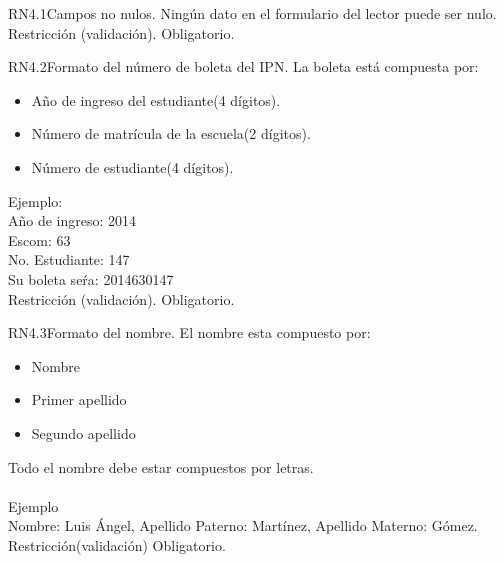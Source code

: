 
\begin{BussinesRule}{RN4.1}{Campos no nulos.} 
	\BRitem[Descripción:] Ningún dato en el formulario del lector puede ser nulo.
	\BRitem[Tipo:] Restricción (validación).
	\BRitem[Nivel:] Obligatorio.
\end{BussinesRule}


\begin{BussinesRule}{RN4.2}{Formato del número de boleta del IPN.}
	\BRitem[Descripción:] La boleta está compuesta por:
		\begin{itemize} 
			\item Año de ingreso del estudiante(4 dígitos).
			\item Número de matrícula de la escuela(2 dígitos).
			\item Número de estudiante(4 dígitos).
		\end{itemize}
	Ejemplo:\\
		Año de ingreso: 2014\\
		Escom: 63\\
		No. Estudiante: 147\\
		Su boleta seŕa: 2014630147\\
	\BRitem[Tipo:] Restricción (validación).
	\BRitem[Nivel:] Obligatorio.
\end{BussinesRule}


\begin{BussinesRule}{RN4.3}{Formato del nombre.}
	\BRitem[Descripción:] El nombre esta compuesto por:
		\begin{itemize} 
			\item Nombre
			\item Primer apellido
			\item Segundo apellido 
		\end{itemize}
		Todo el nombre debe estar compuestos por letras.\\\\
Ejemplo \\
	Nombre: Luis Ángel, Apellido Paterno: Martínez, Apellido Materno: Gómez.
	\BRitem[Tipo:] Restricción(validación)
	\BRitem[Nivel:] Obligatorio.
\end{BussinesRule}

